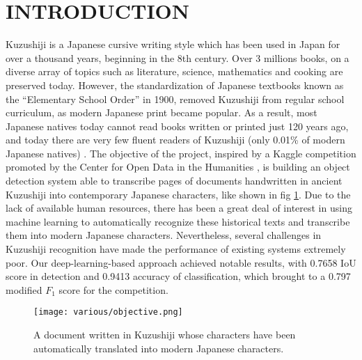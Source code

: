 \section{INTRODUCTION}
\label{sec:intro}

Kuzushiji is a Japanese cursive writing style which has been used in Japan for over a thousand years, beginning in the 8th century. Over 3 millions books, on a diverse array of topics such as literature, science, mathematics and cooking are preserved today. However, the standardization of Japanese textbooks known as the “Elementary School Order” in 1900, removed Kuzushiji from regular school curriculum, as modern Japanese print became popular. As a result, most Japanese natives today cannot read books written or printed just 120 years ago, and today there are very few fluent readers of Kuzushiji (only 0.01\% of modern Japanese natives) \cite{aboutkuz}. The objective of the project, inspired by a Kaggle competition promoted by the Center for Open Data in the Humanities \cite{competition}, is building an object detection system able to transcribe pages of documents handwritten in ancient Kuzushiji into contemporary Japanese characters, like shown in fig \ref{fig:objective}. Due to the lack of available human resources, there has been a great deal of interest in using machine learning to automatically recognize these historical texts and transcribe them into modern Japanese characters. Nevertheless, several challenges in Kuzushiji recognition have made the performance of existing systems extremely poor. Our deep-learning-based approach achieved notable results, with 0.7658 IoU score in detection and 0.9413 accuracy of classification, which brought to a 0.797 modified $F_1$ score for the competition.

\begin{figure}
	\centering
	\caption{A document written in Kuzushiji whose characters have been automatically translated into modern Japanese characters.}
	\texttt{[image: various/objective.png]}
	\label{fig:objective}
\end{figure}